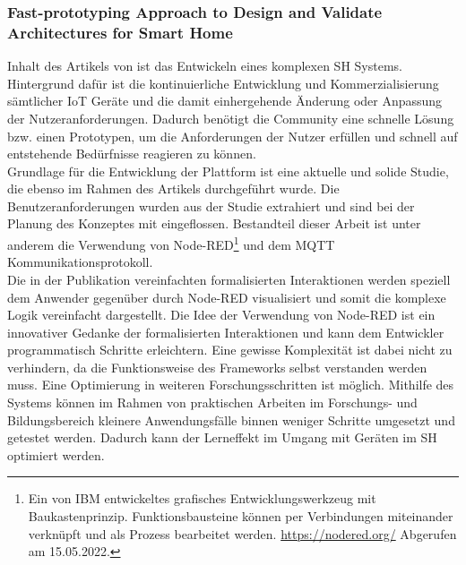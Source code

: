         \subsubsection*{Fast-prototyping Approach to Design and Validate Architectures for Smart Home}  
            Inhalt des Artikels von \cite{Montanaro2021} ist das Entwickeln eines komplexen \acl{SH} Systems. 
            Hintergrund dafür ist die kontinuierliche Entwicklung und Kommerzialisierung sämtlicher \acs{IoT} Geräte und 
            die damit einhergehende Änderung oder Anpassung der Nutzeranforderungen. Dadurch benötigt die Community eine 
            schnelle Lösung bzw. einen Prototypen, um die Anforderungen der Nutzer erfüllen und schnell auf 
            entstehende Bedürfnisse reagieren zu können. 
            \\
            Grundlage für die Entwicklung der Plattform ist eine aktuelle und solide Studie, die ebenso im Rahmen des 
            Artikels durchgeführt wurde. Die Benutzeranforderungen wurden aus der Studie extrahiert und sind bei der 
            Planung des Konzeptes mit eingeflossen. Bestandteil dieser Arbeit ist unter anderem die Verwendung von Node-RED\footnote{Ein von IBM entwickeltes grafisches Entwicklungswerkzeug mit Baukastenprinzip. Funktionsbausteine können per Verbindungen miteinander verknüpft und als Prozess bearbeitet werden. \url{https://nodered.org/} Abgerufen am 15.05.2022.} und 
            dem \acs{MQTT} Kommunikationsprotokoll. 
            \\
            \linebreak
            Die in der Publikation vereinfachten formalisierten Interaktionen werden speziell dem Anwender gegenüber durch 
            Node-RED visualisiert und somit die komplexe Logik vereinfacht dargestellt. Die Idee der Verwendung von Node-RED 
            ist ein innovativer Gedanke der formalisierten Interaktionen und kann dem Entwickler programmatisch Schritte 
            erleichtern. Eine gewisse Komplexität ist dabei nicht zu verhindern, da die Funktionsweise des Frameworks selbst 
            verstanden werden muss.  
            Eine Optimierung in weiteren Forschungsschritten ist möglich.
            Mithilfe des Systems können im Rahmen von praktischen Arbeiten im Forschungs- und Bildungsbereich kleinere Anwendungsfälle binnen 
            weniger Schritte umgesetzt und getestet werden. Dadurch kann der Lerneffekt im Umgang mit Geräten im \acl{SH} optimiert werden. 
    \\
    \linebreak
